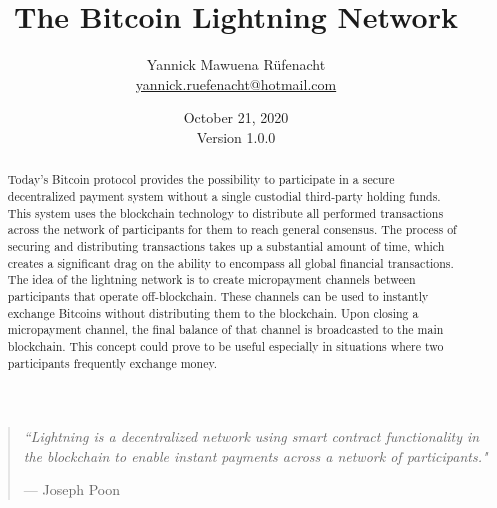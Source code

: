 \documentclass[a4paper, 12pt]{report}
\newcommand{\hsp}{\hspace{20pt}}
\begin{document}
\title{\Large{\textbf{The Bitcoin Lightning Network}}}
\author{Yannick Mawuena Rüfenacht \\ \href{mailto:yannick.ruefenacht@hotmail.com}{yannick.ruefenacht@hotmail.com}}
\date{October 21, 2020\\Version 1.0.0}
\maketitle

\begin{quote}
\vspace*{\fill}
\textit{``Lightning is a decentralized network using smart contract functionality in the blockchain to enable instant payments across a network of participants."}
\par\raggedleft--- \textup{Joseph Poon}
\vspace*{\fill}
\end{quote}

\begin{abstract}
Today’s Bitcoin protocol provides the possibility to participate in a secure decentralized payment system without a single custodial third-party holding funds. This system uses the blockchain technology to distribute all performed transactions across the network of participants for them to reach general consensus. The process of securing and distributing transactions takes up a substantial amount of time, which creates a significant drag on the ability to encompass all global financial transactions. The idea of the lightning network is to create micropayment channels between participants that operate off-blockchain. These channels can be used to instantly exchange Bitcoins without distributing them to the blockchain. Upon closing a micropayment channel, the final balance of that channel is broadcasted to the main blockchain. This concept could prove to be useful especially in situations where two participants frequently exchange money.
\end{abstract}

\tableofcontents
\listoffigures

\setlength{\parskip}{1em}
\setlength{\parindent}{0em}
\titleformat{\chapter}[hang]{\LARGE\bfseries}{\thechapter\hsp\textcolor{gray75}{|}\hsp}{0pt}{\LARGE\bfseries}
\titleformat{\section}[hang]{\large\bfseries}{\thesection\hsp\textcolor{gray75}{|}\hsp}{0pt}{\large\bfseries}
\end{document}
